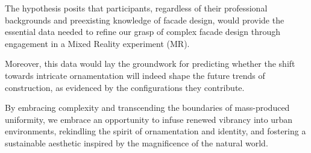 The hypothesis posits that participants, regardless of their professional backgrounds and preexisting knowledge of facade design, would provide the essential data needed to refine our grasp of complex facade design through engagement in a Mixed Reality experiment (MR).

Moreover, this data would lay the groundwork for predicting whether the shift towards intricate ornamentation will indeed shape the future trends of construction, as evidenced by the configurations they contribute.

By embracing complexity and transcending the boundaries of mass-produced uniformity, we embrace an opportunity to infuse renewed vibrancy into urban environments, rekindling the spirit of ornamentation and identity, and fostering a sustainable aesthetic inspired by the magnificence of the natural world.

        







